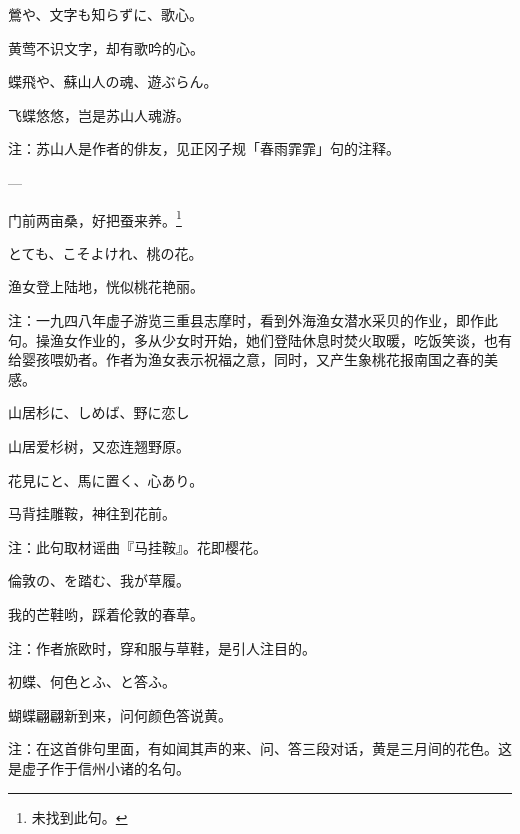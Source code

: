 \begin{haiku}
    {\FH 鶯や、文字も知らずに、歌心。}

    {\FK 黄莺不识文字，却有歌吟的心。}
\end{haiku}

\begin{haiku}
    {\FH 蝶飛や、蘇山人の魂、遊ぶらん。}

    {\FK 飞蝶悠悠，岂是苏山人魂游。}

    {\FT 注：苏山人是作者的俳友，见正冈子规「春雨霏霏」句的注释。}
\end{haiku}

\begin{haiku}
    {\FH ---}

    {\FK 门前两亩桑，好把蚕来养。\footnote{\FT 未找到此句。}}
\end{haiku}

\begin{haiku}
    {\FH {}とても、こそよけれ、桃の花。}

    {\FK 渔女登上陆地，恍似桃花艳丽。}

    {\FT 注：一九四八年虚子游览三重县志摩时，看到外海渔女潜水采贝的作业，即作此句。操渔女作业的，多从少女时开始，她们登陆休息时焚火取暖，吃饭笑谈，也有给婴孩喂奶者。作者为渔女表示祝福之意，同时，又产生象桃花报南国之春的美感。}
\end{haiku}

\begin{haiku}
    {\FH 山居杉に、しめば、野に恋し}

    {\FK 山居爱杉树，又恋连翘野原。}
\end{haiku}

\begin{haiku}
    {\FH 花見にと、馬に置く、心あり。}

    {\FK 马背挂雕鞍，神往到花前。}

    {\FT 注：此句取材谣曲『马挂鞍』。花即樱花。}
\end{haiku}

\begin{haiku}
    {\FH 倫敦の、を踏む、我が草履。}

    {\FK 我的芒鞋哟，踩着伦敦的春草。}

    {\FT 注：作者旅欧时，穿和服与草鞋，是引人注目的。}
\end{haiku}

\begin{haiku}
    {\FH 初蝶、何色とふ、と答ふ。}

    {\FK 蝴蝶翩翩新到来，问何颜色答说黄。}

    {\FT 注：在这首俳句里面，有如闻其声的来、问、答三段对话，黄是三月间的花色。这是虚子作于信州小诸的名句。}
\end{haiku}

